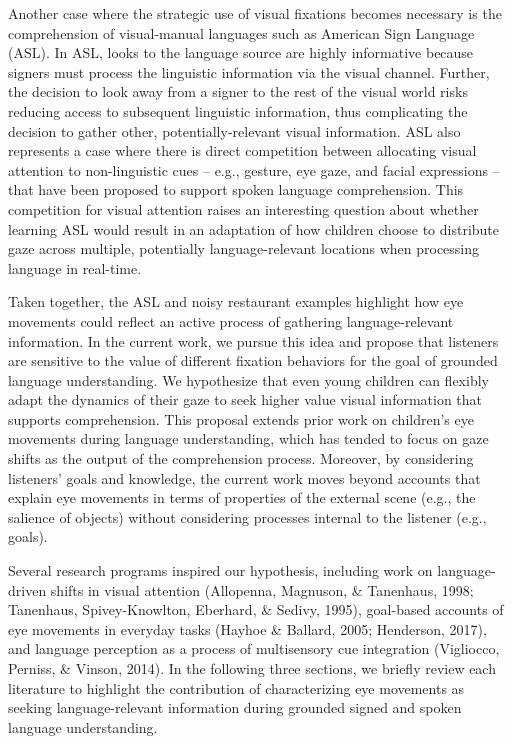 \documentclass[,man,floatsintext]{apa6}
\begin{document}
Another case where the strategic use of visual fixations becomes necessary is the comprehension of visual-manual languages such as American Sign Language (ASL). In ASL, looks to the language source are highly informative because signers must process the linguistic information via the visual channel. Further, the decision to look away from a signer to the rest of the visual world risks reducing access to subsequent linguistic information, thus complicating the decision to gather other, potentially-relevant visual information. ASL also represents a case where there is direct competition between allocating visual attention to non-linguistic cues -- e.g., gesture, eye gaze, and facial expressions -- that have been proposed to support spoken language comprehension. This competition for visual attention raises an interesting question about whether learning ASL would result in an adaptation of how children choose to distribute gaze across multiple, potentially language-relevant locations when processing language in real-time.

Taken together, the ASL and noisy restaurant examples highlight how eye movements could reflect an active process of gathering language-relevant information. In the current work, we pursue this idea and propose that listeners are sensitive to the value of different fixation behaviors for the goal of grounded language understanding. We hypothesize that even young children can flexibly adapt the dynamics of their gaze to seek higher value visual information that supports comprehension. This proposal extends prior work on children's eye movements during language understanding, which has tended to focus on gaze shifts as the output of the comprehension process. Moreover, by considering listeners' goals and knowledge, the current work moves beyond accounts that explain eye movements in terms of properties of the external scene (e.g., the salience of objects) without considering processes internal to the listener (e.g., goals).

Several research programs inspired our hypothesis, including work on language-driven shifts in visual attention (Allopenna, Magnuson, \& Tanenhaus, 1998; Tanenhaus, Spivey-Knowlton, Eberhard, \& Sedivy, 1995), goal-based accounts of eye movements in everyday tasks (Hayhoe \& Ballard, 2005; Henderson, 2017), and language perception as a process of multisensory cue integration (Vigliocco, Perniss, \& Vinson, 2014). In the following three sections, we briefly review each literature to highlight the contribution of characterizing eye movements as seeking language-relevant information during grounded signed and spoken language understanding.
\end{document}
